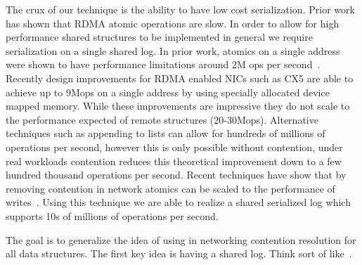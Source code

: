 The crux of our technique is the ability to have low cost serialization. Prior
work has shown that RDMA atomic operations are slow. In order to allow for high
performance shared structures to be implemented in general we require
serialization on a single shared log. In prior work, atomics on a single address
were shown to have performance limitations around 2M ops per
second~\cite{design-guidelines}. Recently design improvements for RDMA enabled
NICs such as CX5 are able to achieve up to 9Mops on a single address by using
specially allocated device mapped memory. While these improvements are
impressive they do not scale to the performance expected of remote structures
(20-30Mops). Alternative techniques such as appending to lists can allow for
hundreds of millions of operations per second, however this is only possible
without contention, under real workloads contention reduces this theoretical
improvement down to a few hundred thousand operations per second. Recent
techniques have show that by removing contention in network atomics can be
scaled to the performance of writes~\cite{Grant2021InContRes}. Using this
technique we are able to realize a shared serialized log which supports 10s of
millions of operations per second.


The goal is to generalize the idea of using in networking contention resolution
for all data structures. The first key idea is having a shared log. Think sort
of like~\cite{black-box-numa}.

